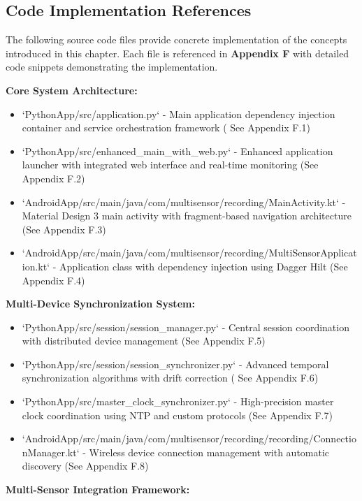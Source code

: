 \documentclass[12pt,a4paper]{report}
\begin{document}
\subsection{Code Implementation References}

The following source code files provide concrete implementation of the concepts introduced in this chapter. Each file is
referenced in \textbf{Appendix F} with detailed code snippets demonstrating the implementation.

\textbf{Core System Architecture:}

\begin{itemize}
\item `PythonApp/src/application.py` - Main application dependency injection container and service orchestration framework (
  See Appendix F.1)
\item `PythonApp/src/enhanced_main_with_web.py` - Enhanced application launcher with integrated web interface and real-time
  monitoring (See Appendix F.2)
\item `AndroidApp/src/main/java/com/multisensor/recording/MainActivity.kt` - Material Design 3 main activity with
  fragment-based navigation architecture (See Appendix F.3)
\item `AndroidApp/src/main/java/com/multisensor/recording/MultiSensorApplication.kt` - Application class with dependency
  injection using Dagger Hilt (See Appendix F.4)

\end{itemize}
\textbf{Multi-Device Synchronization System:}

\begin{itemize}
\item `PythonApp/src/session/session_manager.py` - Central session coordination with distributed device management (See
  Appendix F.5)
\item `PythonApp/src/session/session_synchronizer.py` - Advanced temporal synchronization algorithms with drift correction (
  See Appendix F.6)
\item `PythonApp/src/master_clock_synchronizer.py` - High-precision master clock coordination using NTP and custom
  protocols (See Appendix F.7)
\item `AndroidApp/src/main/java/com/multisensor/recording/recording/ConnectionManager.kt` - Wireless device connection
  management with automatic discovery (See Appendix F.8)

\end{itemize}
\textbf{Multi-Sensor Integration Framework:}
\end{document}
